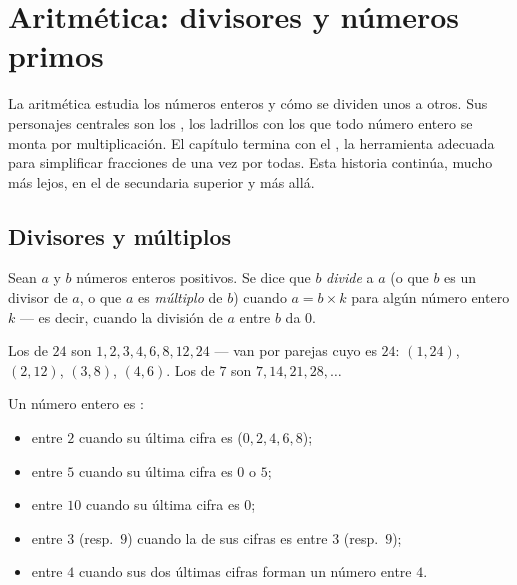 \chapter{Aritmética: divisores y números primos}\label{ch:g9:arith}

La aritmética estudia los números enteros y cómo se dividen unos a otros. Sus
personajes centrales son los , los ladrillos con los que
todo número entero se monta por multiplicación. El capítulo termina con el
, la herramienta adecuada para simplificar fracciones de una
vez por todas. Esta historia continúa, mucho más lejos, en el 
de secundaria superior y más allá.

\section{Divisores y múltiplos}

\begin{definition}\label{def:g9:arith:divisor}
Sean $a$ y $b$ números enteros positivos. Se dice que $b$
\emph{divide} a $a$ (o que $b$ es un divisor de $a$, o
que $a$ es \emph{múltiplo} de $b$) cuando $a = b \times
k$ para algún número entero $k$ --- es decir, cuando la división de $a$ entre $b$
da  $0$.
\end{definition}

\begin{example}
Los  de $24$ son $1, 2, 3, 4, 6, 8, 12, 24$ --- van por
parejas cuyo  es $24$: $(1,24)$, $(2,12)$, $(3,8)$, $(4,6)$. Los
 de $7$ son $7, 14, 21, 28, \dots$
\end{example}

\begin{proposition}\label{prop:g9:arith:rules}
Un número entero es :
\begin{itemize}
  \item entre $2$ cuando su última cifra es  ($0, 2, 4, 6, 8$);
  \item entre $5$ cuando su última cifra es $0$ o $5$;
  \item entre $10$ cuando su última cifra es $0$;
  \item entre $3$ (resp.\ $9$) cuando la  de sus cifras es  entre
        $3$ (resp.\ $9$);
  \item entre $4$ cuando sus dos últimas cifras forman un número  entre $4$.
\end{itemize}
\end{proposition}
\admitted

